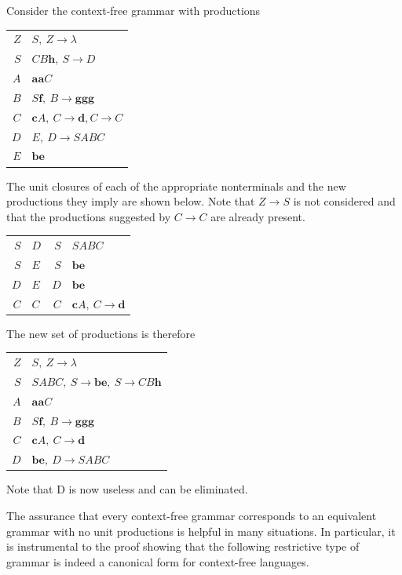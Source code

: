 Consider the context-free grammar with productions
\begin{center}\begin{tabular}{r@{ $\rightarrow$ }l}
$Z$ & $S,\ Z\rightarrow\lambda$ \\
$S$ & $CB\pmb{h},\ S\rightarrow D$ \\
$A$ & $\pmb{aa}C$ \\
$B$ & $S\pmb{f},\ B\rightarrow\pmb{ggg}$ \\
$C$ & $\pmb{c}A,\ C\rightarrow\pmb{d},C\rightarrow C$ \\
$D$ & $E,\ D\rightarrow SABC$ \\
$E$ & $\pmb{be}$
\end{tabular}\end{center}
The unit closures of each of the appropriate nonterminals and the new
productions they imply are shown below. Note that $Z\rightarrow S$ is not
considered and that the productions suggested by $C\rightarrow C$ are already
present.
\begin{center}\begin{tabular}{r@{ \ $\DRightarrow$ }l@{$\qquad$}r@{ $\rightarrow$ }l}
$S$ & $D$ & $S$ & $SABC$ \\
$S$ & $E$ & $S$ & $\pmb{be}$ \\
$D$ & $E$ & $D$ & $\pmb{be}$ \\
$C$ & $C$ & $C$ & $\pmb{c}A,\ C\rightarrow\pmb{d}$
\end{tabular}\end{center}
The new set of productions is therefore
\begin{center}\begin{tabular}{r@{ $\rightarrow$ }l}
$Z$ & $S,\ Z\rightarrow\lambda$ \\
$S$ & $SABC,\ S\rightarrow\pmb{be},\ S\rightarrow CB\pmb{h}$ \\
$A$ & $\pmb{aa}C$ \\
$B$ & $S\pmb{f},\ B\rightarrow\pmb{ggg}$ \\
$C$ & $\pmb{c}A,\ C\rightarrow\pmb{d}$ \\
$D$ & $\pmb{be},\ D\rightarrow SABC$ \\
\end{tabular}\end{center}
Note that D is now useless and can be eliminated.

The assurance that every context-free grammar corresponds to an equivalent
grammar with no unit productions is helpful in many situations. In particular,
it is instrumental to the proof showing that the following restrictive type of
grammar is indeed a canonical form for context-free languages.

